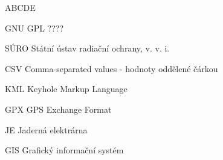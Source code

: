 
\begin{seznamzkratek}{ABCDE}

	      {GNU GPL}
	      {????}

	      {SÚRO}
	      {Státní ústav radiační ochrany, v. v. i.}

		  {CSV}
		  {Comma-separated values - hodnoty oddělené čárkou}
		  
		  {KML}
		  {Keyhole Markup Language}
		  
		  {GPX}
		  {GPS Exchange Format}
	
		  {JE}
		  {Jaderná elektrárna}
		  
		  {GIS}
		  {Grafický informační systém}
\end{seznamzkratek}